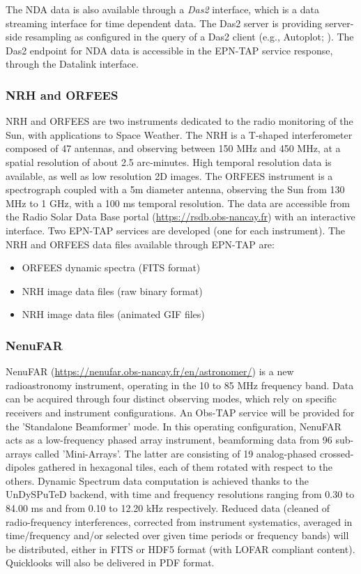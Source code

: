 \documentclass[11pt,a4paper]{ivoa}
\begin{document}
The NDA data is also available through a \emph{Das2} \citep{10.1002/essoar.10500359.1} interface, which is a data streaming interface for time dependent data. The Das2 server is providing server-side resampling as configured in the query of a Das2 client (e.g., Autoplot; \cite{10.1007/s12145-010-0049-0}). The Das2 endpoint for NDA data is accessible in the EPN-TAP service response, through the Datalink interface.
 
\subsubsection{NRH and ORFEES}
NRH and ORFEES are two instruments dedicated to the radio monitoring of the Sun, with applications to 
Space Weather. The NRH is a T-shaped interferometer composed of 47 antennas, and observing between 150 
MHz and 450 MHz, at a spatial resolution of about 2.5 arc-minutes. High temporal resolution data is 
available, as well as low resolution 2D images. The ORFEES instrument is a spectrograph coupled with a 
5m diameter antenna, observing the Sun from 130 MHz to 1 GHz, with a 100 ms temporal resolution. The 
data are accessible from the Radio Solar Data Base portal (\url{https://rsdb.obs-nancay.fr}) with an 
interactive interface. Two EPN-TAP services are developed (one for each instrument). The NRH and ORFEES data files available through EPN-TAP are:
\begin{itemize}
\item ORFEES dynamic spectra (FITS format)
\item NRH image data files (raw binary format)
\item NRH image data files (animated GIF files)
\end{itemize}


\subsubsection{NenuFAR}
NenuFAR (\url{https://nenufar.obs-nancay.fr/en/astronomer/}) is a new radioastronomy instrument, operating in the 10 to 85 MHz frequency band. Data can be acquired through four distinct observing modes, which rely on specific receivers and instrument configurations. An Obs-TAP service will be provided for the 'Standalone Beamformer' mode. In this operating configuration, NenuFAR acts as a low-frequency phased array instrument, beamforming data from 96 sub-arrays called 'Mini-Arrays'. The latter are consisting of 19 analog-phased crossed-dipoles gathered in hexagonal tiles, each of them rotated with respect to the others. Dynamic Spectrum data computation is achieved thanks to the UnDySPuTeD backend, with time and frequency resolutions ranging from 0.30 to 84.00 ms and from 0.10 to 12.20 kHz respectively. Reduced data (cleaned of radio-frequency interferences, corrected from instrument systematics, averaged in time/frequency and/or selected over given time periods or frequency bands) will be distributed, either in FITS or HDF5 format (with LOFAR compliant content). Quicklooks will also be delivered in PDF format.
\end{document}
